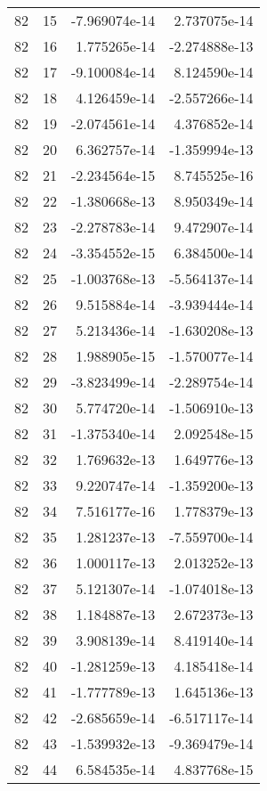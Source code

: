 \begin{tabular}{rrrr}
  82 &   15 & -7.969074e-14 &  2.737075e-14 \\
  82 &   16 &  1.775265e-14 & -2.274888e-13 \\
  82 &   17 & -9.100084e-14 &  8.124590e-14 \\
  82 &   18 &  4.126459e-14 & -2.557266e-14 \\
  82 &   19 & -2.074561e-14 &  4.376852e-14 \\
  82 &   20 &  6.362757e-14 & -1.359994e-13 \\
  82 &   21 & -2.234564e-15 &  8.745525e-16 \\
  82 &   22 & -1.380668e-13 &  8.950349e-14 \\
  82 &   23 & -2.278783e-14 &  9.472907e-14 \\
  82 &   24 & -3.354552e-15 &  6.384500e-14 \\
  82 &   25 & -1.003768e-13 & -5.564137e-14 \\
  82 &   26 &  9.515884e-14 & -3.939444e-14 \\
  82 &   27 &  5.213436e-14 & -1.630208e-13 \\
  82 &   28 &  1.988905e-15 & -1.570077e-14 \\
  82 &   29 & -3.823499e-14 & -2.289754e-14 \\
  82 &   30 &  5.774720e-14 & -1.506910e-13 \\
  82 &   31 & -1.375340e-14 &  2.092548e-15 \\
  82 &   32 &  1.769632e-13 &  1.649776e-13 \\
  82 &   33 &  9.220747e-14 & -1.359200e-13 \\
  82 &   34 &  7.516177e-16 &  1.778379e-13 \\
  82 &   35 &  1.281237e-13 & -7.559700e-14 \\
  82 &   36 &  1.000117e-13 &  2.013252e-13 \\
  82 &   37 &  5.121307e-14 & -1.074018e-13 \\
  82 &   38 &  1.184887e-13 &  2.672373e-13 \\
  82 &   39 &  3.908139e-14 &  8.419140e-14 \\
  82 &   40 & -1.281259e-13 &  4.185418e-14 \\
  82 &   41 & -1.777789e-13 &  1.645136e-13 \\
  82 &   42 & -2.685659e-14 & -6.517117e-14 \\
  82 &   43 & -1.539932e-13 & -9.369479e-14 \\
  82 &   44 &  6.584535e-14 &  4.837768e-15 \\

\end{tabular}
